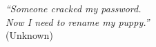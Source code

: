 \begin{titlepage}
	\thispagestyle{empty}
	\begin{flushright}
		\vspace*{40 mm}
		
		\small{\emph{``Someone cracked my password.\\Now I need to rename my puppy.''}\\(Unknown)}
		
	\end{flushright}	
	\vfill
\end{titlepage}
\thispagestyle{empty}